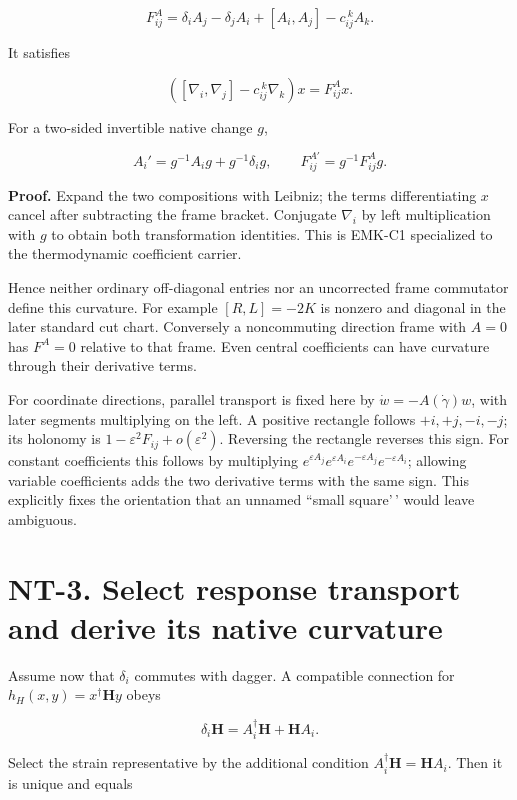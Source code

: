 \documentclass[
  11pt,
]{article}
\begin{document}
\[
\boxed{F^A_{ij}=\delta_iA_j-\delta_jA_i+[A_i,A_j]-c_{ij}^{\ k}A_k.}
\]

It satisfies

\[
([\nabla_i,\nabla_j]-c_{ij}^{\ k}\nabla_k)x=F^A_{ij}x.
\]

For a two-sided invertible native change \(g\),

\[
A_i'=g^{-1}A_ig+g^{-1}\delta_i g,\qquad
F^{A'}_{ij}=g^{-1}F^A_{ij}g.
\]

\textbf{Proof.} Expand the two compositions with Leibniz; the terms
differentiating \(x\) cancel after subtracting the frame bracket.
Conjugate \(\nabla_i\) by left multiplication with \(g\) to obtain both
transformation identities. This is EMK-C1 specialized to the
thermodynamic coefficient carrier.

Hence neither ordinary off-diagonal entries nor an uncorrected frame
commutator define this curvature. For example \([R,L]=-2K\) is nonzero
and diagonal in the later standard cut chart. Conversely a noncommuting
direction frame with \(A=0\) has \(F^A=0\) relative to that frame. Even
central coefficients can have curvature through their derivative terms.

For coordinate directions, parallel transport is fixed here by
\(\dot w=-A(\dot\gamma)w\), with later segments multiplying on the left.
A positive rectangle follows \(+i,+j,-i,-j\); its holonomy is
\(1-\varepsilon^2F_{ij}+o(\varepsilon^2)\). Reversing the rectangle
reverses this sign. For constant coefficients this follows by
multiplying
\(e^{\varepsilon A_j}e^{\varepsilon A_i} e^{-\varepsilon A_j}e^{-\varepsilon A_i}\);
allowing variable coefficients adds the two derivative terms with the
same sign. This explicitly fixes the orientation that an unnamed ``small
square'\,' would leave ambiguous.

\hypertarget{nt-3.-select-response-transport-and-derive-its-native-curvature}{%
\section{NT-3. Select response transport and derive its native
curvature}\label{nt-3.-select-response-transport-and-derive-its-native-curvature}}

Assume now that \(\delta_i\) commutes with dagger. A compatible
connection for \(h_H(x,y)=x^\dagger\mathbf Hy\) obeys

\[
\delta_i\mathbf H=A_i^\dagger\mathbf H+\mathbf HA_i.
\]

Select the strain representative by the additional condition
\(A_i^\dagger\mathbf H=\mathbf HA_i\). Then it is unique and equals
\end{document}
